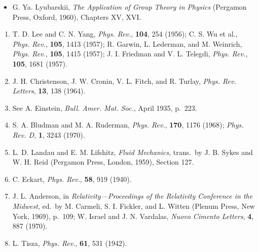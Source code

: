 \begin{itemize}
  \item[\(\square\)] G. Ya. Lyubarskii, \emph{The Application of Group Theory
  in Physics} (Pergamon Press, Oxford, 1960), Chapters XV, XVI.
\end{itemize}


\begin{enumerate}
  \item {}\label{ch2-ref-1}
  T. D. Lee and C. N. Yang, \emph{Phys. Rev.}, \textbf{104}, 254 (1956);
  C. S. Wu et al., \emph{Phys. Rev.}, \textbf{105}, 1413 (1957);
  R. Garwin, L. Lederman, and M. Weinrich, \emph{Phys. Rev.},
  \textbf{105}, 1415 (1957);
  J. I. Friedman and V. L. Telegdi, \emph{Phys. Rev.},
  \textbf{105}, 1681 (1957).

  \item {}\label{ch2-ref-2}
  J. H. Christenson, J. W. Cronin, V. L. Fitch, and R. Turlay,
  \emph{Phys. Rev. Letters}, \textbf{13}, 138 (1964).

  \item {}\label{ch2-ref-3}
  See A. Einstein, \emph{Bull. Amer. Mat. Soc.}, April 1935, p.~223.

  \item {}\label{ch2-ref-4}
  S. A. Bludman and M. A. Ruderman, \emph{Phys. Rev.},
  \textbf{170}, 1176 (1968); \emph{Phys. Rev. D}, \textbf{1}, 3243 (1970).

  \item {}\label{ch2-ref-5}
  L. D. Landau and E. M. Lifshitz, \emph{Fluid Mechanics}, trans.\ by
  J. B. Sykes and W. H. Reid (Pergamon Press, London, 1959), Section 127.

  \item {}\label{ch2-ref-6}
  C. Eckart, \emph{Phys. Rev.}, \textbf{58}, 919 (1940).

  \item {}\label{ch2-ref-7}
  J. L. Anderson, in \emph{Relativity---Proceedings of the Relativity
  Conference in the Midwest}, ed.\ by M. Carmeli, S. I. Fickler, and
  L. Witten (Plenum Press, New York, 1969), p.~109;
  W. Israel and J. N. Vardalas, \emph{Nuovo Cimento Letters},
  \textbf{4}, 887 (1970).

  \item {}\label{ch2-ref-8}
  L. Tisza, \emph{Phys. Rev.}, \textbf{61}, 531 (1942).


\end{enumerate}
